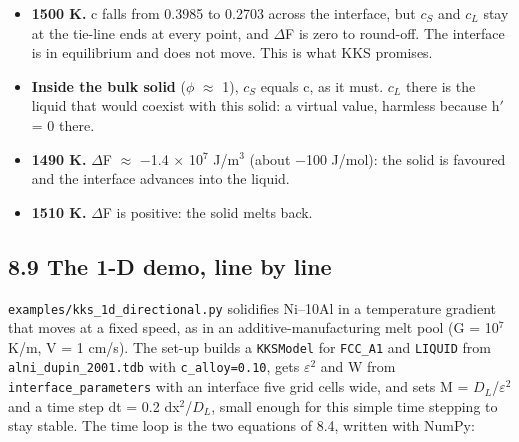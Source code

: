 \documentclass[12pt,a4paper]{article}
\begin{document}
\begin{itemize}
\item \textbf{1500 K.} c falls from 0.3985 to 0.2703 across the interface, but \(c_{S}\) and \(c_{L}\) stay at the tie-line ends at every point, and \(\Delta\)F is zero to round-off. The interface is in equilibrium and does not move. This is what KKS promises.
\item \textbf{Inside the bulk solid} (\(\phi\) \(\approx\) 1), \(c_{S}\) equals c, as it must. \(c_{L}\) there is the liquid that would coexist with this solid: a virtual value, harmless because h\('\) = 0 there.
\item \textbf{1490 K.} \(\Delta\)F \(\approx\) \(-\)1.4 \(\times\) 10\(^{7}\) J/m\(^{3}\) (about \(-\)100 J/mol): the solid is favoured and the interface advances into the liquid.
\item \textbf{1510 K.} \(\Delta\)F is positive: the solid melts back.
\end{itemize}

\subsection*{8.9 The 1-D demo, line by line}
\texttt{examples/\allowbreak{}kks\_\allowbreak{}1d\_\allowbreak{}directional.\allowbreak{}py} solidifies Ni--10Al in a temperature gradient that moves at a fixed speed, as in an additive-manufacturing melt pool (G = 10\(^{7}\) K/m, V = 1 cm/s). The set-up builds a \texttt{KKSModel} for \texttt{FCC\_\allowbreak{}A1} and \texttt{LIQUID} from \texttt{alni\_\allowbreak{}dupin\_\allowbreak{}2001.\allowbreak{}tdb} with \texttt{c\_\allowbreak{}alloy=0.\allowbreak{}10}, gets \(\varepsilon ^{2}\) and W from \texttt{interface\_\allowbreak{}parameters} with an interface five grid cells wide, and sets M = \(D_{L}\)/\(\varepsilon ^{2}\) and a time step dt = 0.2 dx\(^{2}\)/\(D_{L}\), small enough for this simple time stepping to stay stable. The time loop is the two equations of 8.4, written with NumPy:
\end{document}

